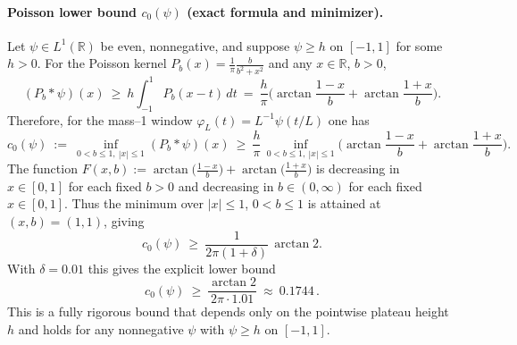 \documentclass[11pt]{article}
\theoremstyle{definition}
\theoremstyle{remark}
\newcommand{\R}{\mathbb{R}}
\begin{document}
\paragraph{Poisson lower bound $c_0(\psi)$ (exact formula and minimizer).}
Let $\psi\in L^1(\R)$ be even, nonnegative, and suppose $\psi\ge h$ on $[-1,1]$ for some $h>0$. For the Poisson kernel $P_b(x)=\frac{1}{\pi}\frac{b}{b^2+x^2}$ and any $x\in\R$, $b>0$,
\[
 (P_b*\psi)(x)\ \ge\ h\int_{-1}^1 P_b(x-t)\,dt\ =\ \frac{h}{\pi}\Big(\arctan\frac{1-x}{b}+\arctan\frac{1+x}{b}\Big).
\]
Therefore, for the mass--1 window $\varphi_L(t)=L^{-1}\psi(t/L)$ one has
\[
 c_0(\psi)\ :=\ \inf_{0<b\le 1,\ |x|\le 1} (P_b*\psi)(x)\ \ge\ \frac{h}{\pi}\,\inf_{0<b\le 1,\ |x|\le 1}\Big(\arctan\frac{1-x}{b}+\arctan\frac{1+x}{b}\Big).
\]
The function $F(x,b):=\arctan\big(\tfrac{1-x}{b}\big)+\arctan\big(\tfrac{1+x}{b}\big)$ is decreasing in $x\in[0,1]$ for each fixed $b>0$ and decreasing in $b\in(0,\infty)$ for each fixed $x\in[0,1]$. Thus the minimum over $|x|\le 1$, $0<b\le 1$ is attained at $(x,b)=(1,1)$, giving
\[
 c_0(\psi)\ \ge\ \frac{1}{2\pi(1+\delta)}\,\arctan 2.
\]
With $\delta=0.01$ this gives the explicit lower bound
\[
 c_0(\psi)\ \ge\ \frac{\arctan 2}{2\pi\cdot 1.01}\ \approx\ 0.1744\,.
\]
This is a fully rigorous bound that depends only on the pointwise plateau height $h$ and holds for any nonnegative $\psi$ with $\psi\ge h$ on $[-1,1]$.
\end{document}
